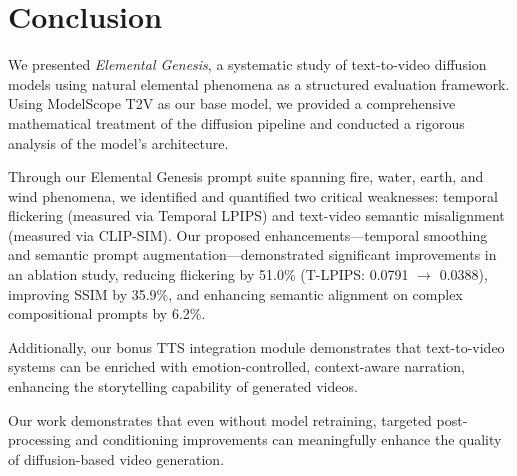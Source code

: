 \documentclass[conference]{IEEEtran}
\begin{document}
\section{Conclusion}

We presented \textit{Elemental Genesis}, a systematic study of text-to-video diffusion models using natural elemental phenomena as a structured evaluation framework. Using ModelScope T2V as our base model, we provided a comprehensive mathematical treatment of the diffusion pipeline and conducted a rigorous analysis of the model's architecture.

Through our Elemental Genesis prompt suite spanning fire, water, earth, and wind phenomena, we identified and quantified two critical weaknesses: temporal flickering (measured via Temporal LPIPS) and text-video semantic misalignment (measured via CLIP-SIM). Our proposed enhancements---temporal smoothing and semantic prompt augmentation---demonstrated significant improvements in an ablation study, reducing flickering by 51.0\% (T-LPIPS: 0.0791 $\to$ 0.0388), improving SSIM by 35.9\%, and enhancing semantic alignment on complex compositional prompts by 6.2\%.

Additionally, our bonus TTS integration module demonstrates that text-to-video systems can be enriched with emotion-controlled, context-aware narration, enhancing the storytelling capability of generated videos.

Our work demonstrates that even without model retraining, targeted post-processing and conditioning improvements can meaningfully enhance the quality of diffusion-based video generation.



\end{document}
